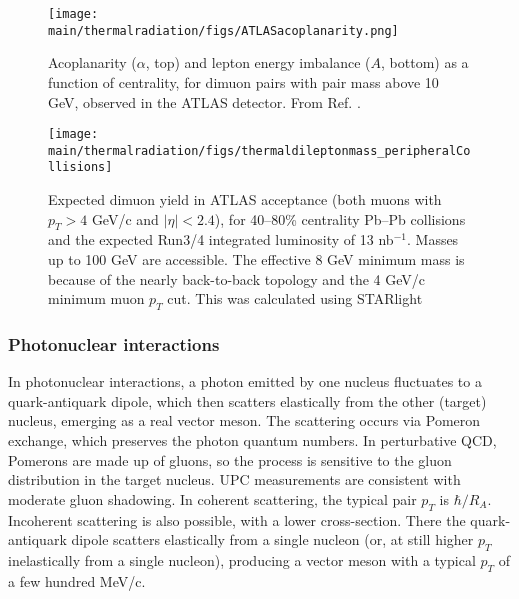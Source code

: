 \documentclass[../report.tex]{subfiles}
\providecommand{\main}{..}
\begin{document}
\begin{figure}[htb]
\centering
\texttt{[image: \\main/thermalradiation/figs/ATLASacoplanarity.png]}
\caption{Acoplanarity ($\alpha$, top) and lepton energy imbalance ($A$, bottom) as a function of centrality, for dimuon pairs with pair mass above 10 GeV, observed in the ATLAS detector.  From Ref. \cite{QM2018:presentation:AaronAngerami}.}
\label{fig:ATLASacoplanarity}
\end{figure}

\begin{figure}[htb]
\centering
\texttt{[image: \\main/thermalradiation/figs/thermaldileptonmass\_peripheralCollisions]}
\caption{Expected dimuon yield in ATLAS acceptance (both muons with $p_T>4$ GeV/c and $|\eta|<2.4$), for 40--80\% centrality Pb--Pb collisions and the expected Run3/4 integrated luminosity of 13 nb$^{-1}$.  Masses up to 100 GeV are accessible.  The effective 8 GeV minimum mass is because of the nearly back-to-back topology and the 4 GeV/c minimum muon $p_T$ cut. This was calculated using STARlight \cite{Klein:2016yzr,Klein:2018cjh}
}
\label{fig:project} 
\end{figure}


\subsubsection{Photonuclear interactions}

In photonuclear interactions, a photon emitted by one nucleus fluctuates to a quark-antiquark dipole, which then scatters elastically from the other (target) nucleus, emerging as a real vector meson.  The scattering occurs via Pomeron exchange, which preserves the photon quantum numbers.  In perturbative QCD, Pomerons are made up of gluons, so the process is sensitive to the gluon distribution in the target nucleus.  UPC measurements are consistent with moderate gluon shadowing.   In coherent scattering, the typical pair $p_T$ is $\hbar/R_A$.  Incoherent scattering is also possible, with a lower cross-section.  There the quark-antiquark dipole scatters elastically from a single nucleon (or, at still higher $p_T$ inelastically from a single nucleon), producing a vector meson with a typical $p_T$ of a few hundred MeV/c.
\end{document}
